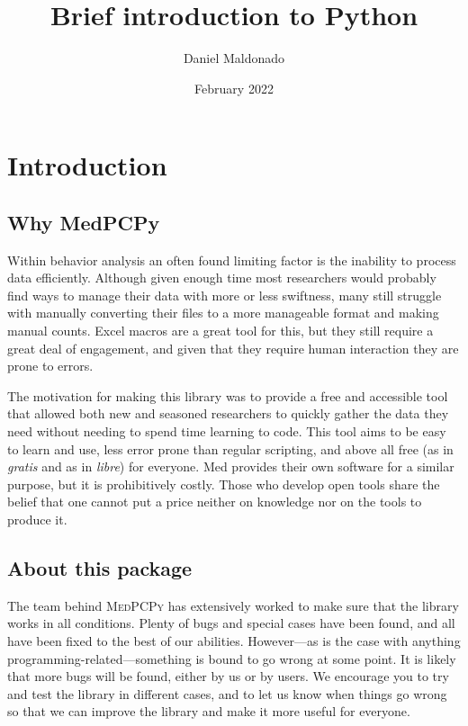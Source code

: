 \documentclass[a4paper,12pt]{article}
\title{Brief introduction to Python}
\author{Daniel Maldonado}
\date{February 2022}
\begin{document}
{\scshape\bfseries \maketitle}

\tableofcontents

\newpage
\section{Introduction}

\subsection{Why MedPCPy}

Within behavior analysis an often found limiting factor is the inability to process data efficiently. Although given enough time most researchers would probably find ways to manage their data with more or less swiftness, many still struggle with manually converting their files to a more manageable format and making manual counts. Excel macros are a great tool for this, but they still require a great deal of engagement, and given that they require human interaction they are prone to errors.

The motivation for making this library was to provide a free and accessible tool that allowed both new and seasoned researchers to quickly gather the data they need without needing to spend time learning to code. This tool aims to be easy to learn and use, less error prone than regular scripting, and above all free (as in {\slshape gratis} and as in {\slshape libre}) for everyone. Med provides their own software for a similar purpose, but it is prohibitively costly. Those who develop open tools share the belief that one cannot put a price neither on knowledge nor on the tools to produce it.

\subsection{About this package}

The team behind {\scshape MedPCPy} has extensively worked to make sure that the library works in all conditions. Plenty of bugs and special cases have been found, and all have been fixed to the best of our abilities. However---as is the case with anything programming-related---something is bound to go wrong at some point. It is likely that more bugs will be found, either by us or by users. We encourage you to try and test the library in different cases, and to let us know when things go wrong so that we can improve the library and make it more useful for everyone.
\end{document}
